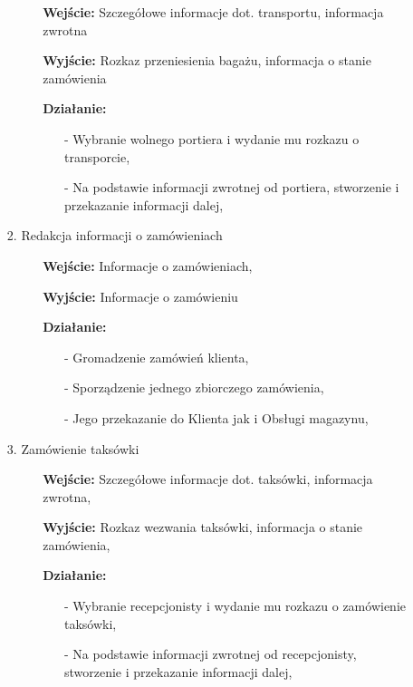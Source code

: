 \documentclass[a4paper, 11pt]{article}
\begin{document}
\begin{enumerate}[label*=\arabic*.]
\begin{enumerate}[label*=\arabic*.]
\begin{enumerate}[label*=\arabic*.]
				\begin{itemize}
					\item [\textbf{Wejście:}] Szczegółowe informacje dot. transportu, informacja zwrotna
					\item [\textbf{Wyjście:}] Rozkaz przeniesienia bagażu, informacja o stanie zamówienia
					\item [\textbf{Działanie:}] 
					\begin{itemize}
						\item[-] Wybranie wolnego portiera i wydanie mu rozkazu o transporcie,
						\item[-] Na podstawie informacji zwrotnej od portiera, stworzenie i przekazanie informacji dalej,
					\end{itemize}
				\end{itemize}
				\item Redakcja informacji o zamówieniach
				\begin{itemize}
					\item [\textbf{Wejście:}] Informacje o zamówieniach, 
					\item [\textbf{Wyjście:}] Informacje o zamówieniu
					\item [\textbf{Działanie:}] 
					\begin{itemize}
						\item[-] Gromadzenie zamówień klienta,
						\item[-] Sporządzenie jednego zbiorczego zamówienia,
						\item[-] Jego przekazanie do Klienta jak i Obsługi magazynu,
					\end{itemize}
				\end{itemize}
				\item Zamówienie taksówki
				\begin{itemize}
					\item [\textbf{Wejście:}] Szczegółowe informacje dot. taksówki, informacja zwrotna,
					\item [\textbf{Wyjście:}] Rozkaz wezwania taksówki, informacja o stanie zamówienia,
					\item [\textbf{Działanie:}] 
					\begin{itemize}
						\item[-] Wybranie recepcjonisty i wydanie mu rozkazu o zamówienie taksówki,
						\item[-] Na podstawie informacji zwrotnej od recepcjonisty, stworzenie i przekazanie informacji dalej,
					\end{itemize}
				\end{itemize}

\end{enumerate}
\end{enumerate}
\end{enumerate}
\end{document}
